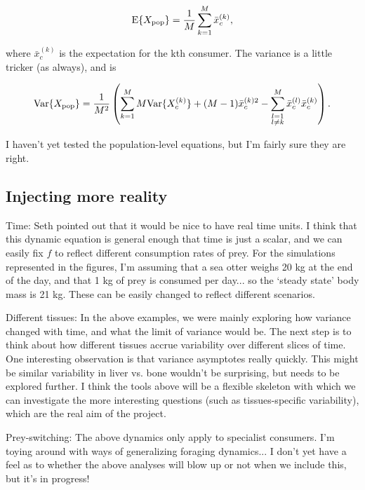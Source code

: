 \documentclass[11pt]{article}
\begin{document}
\begin{equation}
{\rm E}\{X_{\rm pop}\} = \frac{1}{M}\sum_{k=1}^M \bar{x}_c^{(k)},
\end{equation}

\noindent where $\bar{x}_c^{(k)}$ is the expectation for the kth consumer.
The variance is a little tricker (as always), and is

\begin{equation}
{\rm Var}\{X_{\rm pop}\} = \frac{1}{M^2}\left(\sum_{k=1}^M M {\rm Var}\{X_c^{(k)}\} + (M-1)	\bar{x}_c^{(k)2} - \sum_{\substack{
	l=1 \\
	l \neq k}							
	}^M  \bar{x}_c^{(l)} \bar{x}_c^{(k)} \right).
\end{equation}

\noindent I haven't yet tested the population-level equations, but I'm fairly sure they are right.


\subsection{Injecting more reality} 

Time: Seth pointed out that it would be nice to have real time units.
I think that this dynamic equation is general enough that time is just a scalar, and we can easily fix $f$ to reflect different consumption rates of prey.
For the simulations represented in the figures, I'm assuming that a sea otter weighs 20 kg at the end of the day, and that 1 kg of prey is consumed per day... so the `steady state' body mass is 21 kg.
These can be easily changed to reflect different scenarios.

Different tissues: In the above examples, we were mainly exploring how variance changed with time, and what the limit of variance would be.
The next step is to think about how different tissues accrue variability over different slices of time.
One interesting observation is that variance asymptotes really quickly.
This might be similar variability in liver vs. bone wouldn't be surprising, but needs to be explored further.
I think the tools above will be a flexible skeleton with which we can investigate the more interesting questions (such as tissues-specific variability), which are the real aim of the project.

Prey-switching: The above dynamics only apply to specialist consumers. I'm toying around with ways of generalizing foraging dynamics... I don't yet have a feel as to whether the above analyses will blow up or not when we include this, but it's in progress!
\end{document}
